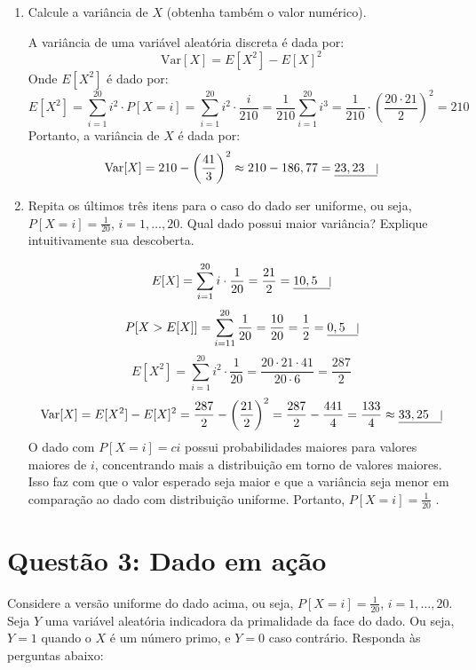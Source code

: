 \documentclass[12 pt]{article}
\begin{document}
\begin{enumerate}
\begin{tcolorbox}[colframe=black, title=Resposta:]
    \end{tcolorbox}
    \item Calcule a variância de $X$ (obtenha também o valor numérico).
    \begin{tcolorbox}[colframe=black, title=Resposta:]
        A variância de uma variável aleatória discreta é dada por:
        $$\text{Var}[X] = E[X^2] - E[X]^2$$
        Onde $E[X^2]$ é dado por:
        $$E[X^2] = \sum_{i=1}^{20} i^2 \cdot P [X = i] = \sum_{i=1}^{20} i^2 \cdot \frac{i}{210} = \frac{1}{210} \sum_{i=1}^{20} i^3 = \frac{1}{210} \cdot \left(\frac{20 \cdot 21}{2}\right)^2 = 210$$
        Portanto, a variância de $X$ é dada por:
        $$\text{Var}[X] = 210 - \left(\frac{41}{3}\right)^2 \approx 210 - 186,77 = \underline{23,23 \quad \vline}$$
    \end{tcolorbox}
    \item Repita os últimos três itens para o caso do dado ser uniforme, ou seja, $P [X = i] = \frac{1}{20}$, $i = 1, \dots, 20$. Qual dado possui maior variância? Explique intuitivamente sua descoberta.
    \begin{tcolorbox}[colframe=black, title=Resposta:]
        $$E[X] = \sum_{i=1}^{20} i \cdot \frac{1}{20} = \frac{21}{2} = \underline{10,5 \quad \vline}$$
        $$P [X > E[X]] = \sum_{i=11}^{20} \frac{1}{20} = \frac{10}{20} = \frac{1}{2} = \underline{0,5 \quad \vline}$$
        $$E[X^2] = \sum_{i=1}^{20} i^2 \cdot \frac{1}{20} = \frac{20 \cdot 21 \cdot 41}{20 \cdot 6} = \frac{287}{2}$$
        $$\text{Var}[X] = E[X^2] - E[X]^2 = \frac{287}{2} - \left(\frac{21}{2}\right)^2 = \frac{287}{2} - \frac{441}{4} = \frac{133}{4} \approx \underline{33,25 \quad \vline}$$
        O dado com $P[X = i] = ci$ possui probabilidades maiores para valores maiores de $i$, concentrando mais a distribuição em torno de valores maiores. Isso faz com que o valor esperado seja maior e que a variância seja menor em comparação ao dado com distribuição uniforme. Portanto,  $P[X = i] = \frac{1}{20}$ .
    \end{tcolorbox}
\end{enumerate}

\section*{Questão 3: Dado em ação}
Considere a versão uniforme do dado acima, ou seja, $P [X = i] = \frac{1}{20}$, $i = 1, \dots, 20$. Seja $Y$ uma variável
aleatória indicadora da primalidade da face do dado. Ou seja, $Y = 1$ quando o $X$ é um número primo,
e $Y = 0$ caso contrário. Responda às perguntas abaixo:
\end{document}
